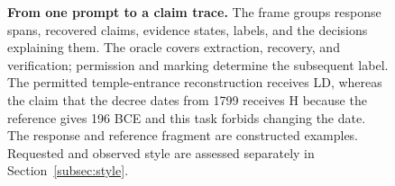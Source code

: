 \documentclass{clv2025}
\newcommand{\LD}{\textsc{LD}}
\newcommand{\Hall}{\textsc{H}}
\begin{document}
\begin{figure}[!t]
{}
\caption{\textbf{From one prompt to a claim trace.}
The frame groups response spans, recovered claims, evidence states, labels,
and the decisions explaining them. The oracle covers extraction, recovery,
and verification; permission and marking determine the subsequent label.
The permitted temple-entrance reconstruction receives \LD{}, whereas the
claim that the decree dates from 1799 receives \Hall{} because the
reference gives 196 BCE and this task forbids changing the date.
The response and reference fragment are constructed examples. Requested
and observed style are assessed separately in Section~\ref{subsec:style}.}

\label{fig:claim-label-annotation}
\end{figure}
\FloatBarrier
\end{document}
